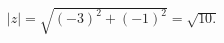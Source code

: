 \documentclass[preview]{standalone}
\begin{document}
\begin{align*}
|z| = \sqrt{   (-3)^2   +   (-1)^2   } = \sqrt{10.}
\end{align*}
\end{document}
